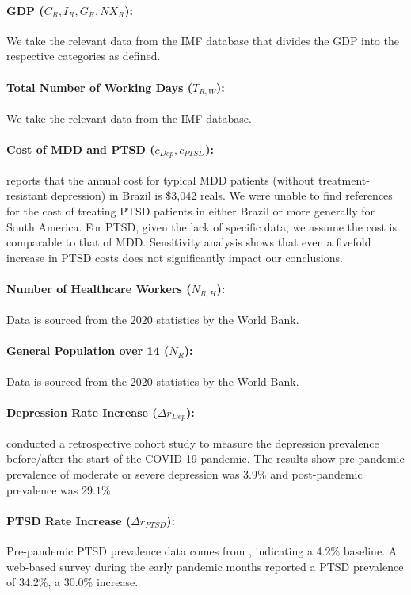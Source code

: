 \documentclass[msom,blindrev]{informs3} %
\begin{document}
\begin{APPENDICES}
\paragraph{GDP ($C_R, I_R, G_R, NX_R$):} We take the relevant data from the IMF database  that divides the GDP into the respective categories as defined. 
\paragraph{Total Number of Working Days ($T_{R,W}$):} We take the relevant data from the IMF database.

\paragraph{Cost of MDD and PTSD ($c_{Dep}, c_{PTSD}$):}  reports that the annual cost for typical MDD patients (without treatment-resistant depression) in Brazil is \$3,042 reals. We were unable to find references for the cost of treating PTSD patients in either Brazil or more generally for South America. For PTSD, given the lack of specific data, we assume the cost is comparable to that of MDD. Sensitivity analysis shows that even a fivefold increase in PTSD costs does not significantly impact our conclusions.

\paragraph{Number of Healthcare Workers ($N_{R,H}$):} Data is sourced from the 2020 statistics by the World Bank.

\paragraph{General Population over 14 ($N_{R}$):} Data is sourced from the 2020 statistics by the World Bank.
\paragraph{Depression Rate Increase ($\Delta r_{Dep}$):}  conducted a retrospective cohort study to measure the depression prevalence before/after  the start of the COVID-19 pandemic. The results show pre-pandemic prevalence of moderate or severe depression was $3.9\%$ and post-pandemic prevalence was $29.1\%$. 

\paragraph{PTSD Rate Increase ($\Delta r_{PTSD}$):} Pre-pandemic PTSD prevalence data comes from , indicating a 4.2\% baseline. A web-based survey during the early pandemic months reported a PTSD prevalence of 34.2\%, a 30.0\% increase. 


\end{APPENDICES}
\end{document}
